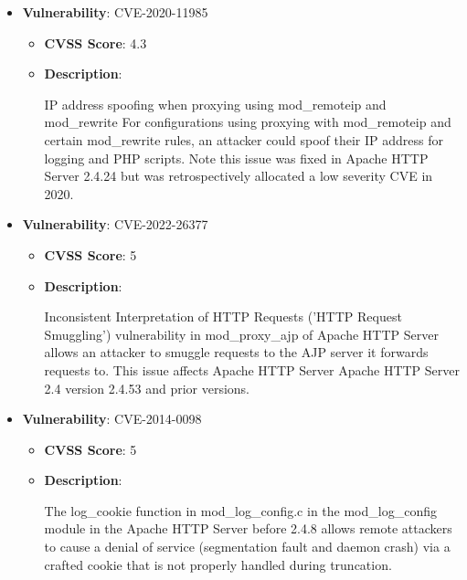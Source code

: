 \documentclass{article}
\begin{document}
\begin{itemize}
        \item \textbf{Vulnerability}: CVE-2020-11985
        \begin{itemize}
            \item \textbf{CVSS Score}:  4.3 
            \item \textbf{Description}:
            \parbox[t]{0.9\linewidth}{
                \ttfamily IP address spoofing when proxying using mod\_remoteip and mod\_rewrite For configurations using proxying with mod\_remoteip and certain mod\_rewrite rules, an attacker could spoof their IP address for logging and PHP scripts. Note this issue was fixed in Apache HTTP Server 2.4.24 but was retrospectively allocated a low severity CVE in 2020.
            }
        \end{itemize}
    
        \item \textbf{Vulnerability}: CVE-2022-26377
        \begin{itemize}
            \item \textbf{CVSS Score}:  5 
            \item \textbf{Description}:
            \parbox[t]{0.9\linewidth}{
                \ttfamily Inconsistent Interpretation of HTTP Requests ('HTTP Request Smuggling') vulnerability in mod\_proxy\_ajp of Apache HTTP Server allows an attacker to smuggle requests to the AJP server it forwards requests to. This issue affects Apache HTTP Server Apache HTTP Server 2.4 version 2.4.53 and prior versions.
            }
        \end{itemize}
    
        \item \textbf{Vulnerability}: CVE-2014-0098
        \begin{itemize}
            \item \textbf{CVSS Score}:  5 
            \item \textbf{Description}:
            \parbox[t]{0.9\linewidth}{
                \ttfamily The log\_cookie function in mod\_log\_config.c in the mod\_log\_config module in the Apache HTTP Server before 2.4.8 allows remote attackers to cause a denial of service (segmentation fault and daemon crash) via a crafted cookie that is not properly handled during truncation.
            }
        \end{itemize}
    

\end{itemize}
\end{document}
